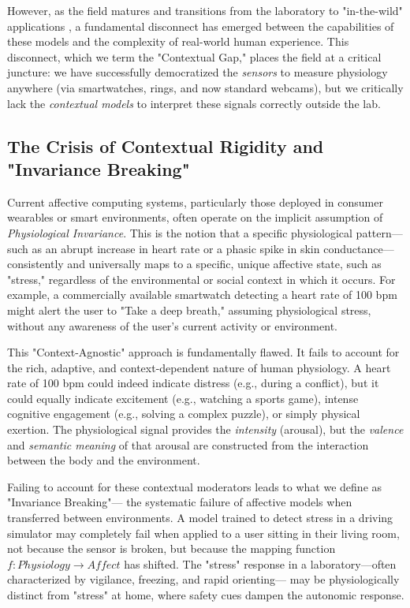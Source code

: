 \documentclass[journal]{IEEEtran}
\begin{document}
However, as the field matures and transitions from the laboratory to "in-the-wild" applications \cite{ambulatory_assessment}, 
a fundamental disconnect has emerged between the capabilities of these models and the complexity of real-world human experience. 
This disconnect, which we term the "Contextual Gap," places the field at a critical juncture: we have successfully democratized 
the \textit{sensors} to measure physiology anywhere (via smartwatches, rings, and now standard webcams), 
but we critically lack the \textit{contextual models} to interpret these signals correctly outside the lab.

\subsection{The Crisis of Contextual Rigidity and "Invariance Breaking"}
Current affective computing systems, particularly those deployed in consumer wearables or smart environments, 
often operate on the implicit assumption of \textit{Physiological Invariance}. 
This is the notion that a specific physiological pattern—such as an abrupt increase in heart rate or a phasic spike in skin conductance—
consistently and universally maps to a specific, unique affective state, such as "stress," regardless of the environmental or social context in which it occurs. 
For example, a commercially available smartwatch detecting a heart rate of 100 bpm might alert the user to "Take a deep breath," assuming physiological stress, 
without any awareness of the user's current activity or environment.

This "Context-Agnostic" approach is fundamentally flawed. It fails to account for the rich, adaptive, and context-dependent nature of human physiology. 
A heart rate of 100 bpm could indeed indicate distress (e.g., during a conflict), but it could equally indicate excitement (e.g., watching a sports game), 
intense cognitive engagement (e.g., solving a complex puzzle), or simply physical exertion. 
The physiological signal provides the \textit{intensity} (arousal), but the \textit{valence} and \textit{semantic meaning} 
of that arousal are constructed from the interaction between the body and the environment.

Failing to account for these contextual moderators leads to what we define as "Invariance Breaking"—
the systematic failure of affective models when transferred between environments. 
A model trained to detect stress in a driving simulator may completely fail when applied to a user sitting in their living room, 
not because the sensor is broken, but because the mapping function $f: Physiology \rightarrow Affect$ has shifted. 
The "stress" response in a laboratory—often characterized by vigilance, freezing, and rapid orienting—
may be physiologically distinct from "stress" at home, where safety cues dampen the autonomic response.
\end{document}
